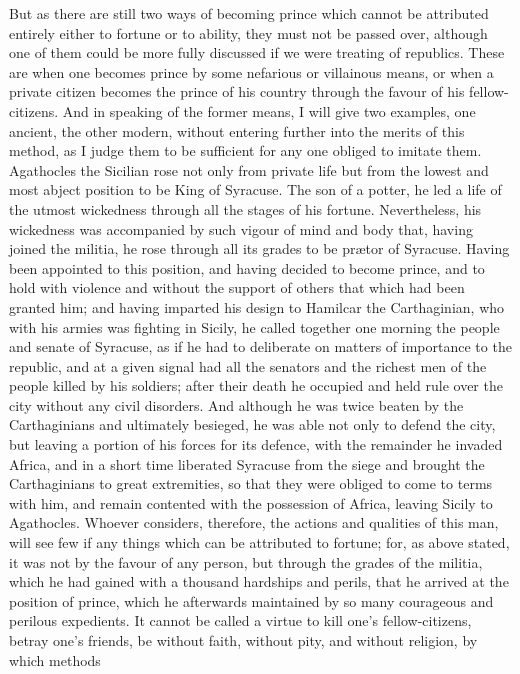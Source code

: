 \documentclass[12pt,letterpaper]{memoir}
\begin{document}
But as there are still two ways of becoming prince which cannot be
attributed entirely either to fortune or to ability, they must not be
passed over, although one of them could be more fully discussed if we
were treating of republics. These are when one becomes prince by some
nefarious or villainous means, or when a private citizen becomes the
prince of his country through the favour of his fellow-citizens. And in
speaking of the former means, I will give two examples, one ancient,
the other modern, without entering further into the merits of this
method, as I judge them to be sufficient for any one obliged to imitate
them. Agathocles the Sicilian rose not only from private life but from
the lowest and most abject position to be King of Syracuse. The son
of a potter, he led a life of the utmost wickedness through all the
stages of his fortune. Nevertheless, his wickedness was accompanied
by such vigour of mind and body that, having joined the militia, he
rose through all its grades to be prætor of Syracuse. Having been
appointed to this position, and having decided to become prince, and
to hold with violence and without the support of others that which
had been granted him; and having imparted his design to Hamilcar the
Carthaginian, who with his armies was fighting in Sicily, he called
together one morning the people and senate of Syracuse, as if he had
to deliberate on matters of importance to the republic, and at a given
signal had all the senators and the richest men of the people killed by
his soldiers; after their death he occupied and held rule over the city
without any civil disorders. And although he was twice beaten by the
Carthaginians and ultimately besieged, he was able not only to defend
the city, but leaving a portion of his forces for its defence, with the
remainder he invaded Africa, and in a short time liberated Syracuse
from the siege and brought the Carthaginians to great extremities, so
that they were obliged to come to terms with him, and remain contented
with the possession of Africa, leaving Sicily to Agathocles. Whoever
considers, therefore, the actions and qualities of this man, will see
few if any things which can be attributed to fortune; for, as above
stated, it was not by the favour of any person, but through the grades
of the militia, which he had gained with a thousand hardships and
perils, that he arrived at the position of prince, which he afterwards
maintained by so many courageous and perilous expedients. It cannot be
called a virtue to kill one's fellow-citizens, betray one's friends,
be without faith, without pity, and without religion, by which methods
\end{document}
